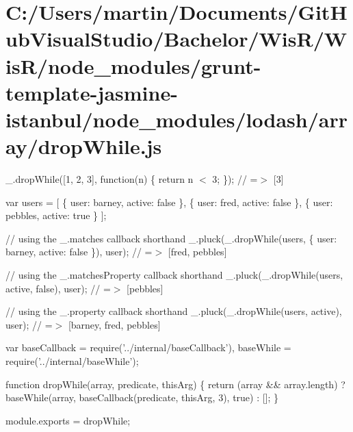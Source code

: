 \hypertarget{_c_1_2_users_2martin_2_documents_2_git_hub_visual_studio_2_bachelor_2_wis_r_2_wis_r_2node_module6c7fd154a53e7b2267a868252c2c0d6c}{}\section{C\+:/\+Users/martin/\+Documents/\+Git\+Hub\+Visual\+Studio/\+Bachelor/\+Wis\+R/\+Wis\+R/node\+\_\+modules/grunt-\/template-\/jasmine-\/istanbul/node\+\_\+modules/lodash/array/drop\+While.\+js}
\+\_\+.\+drop\+While(\mbox{[}1, 2, 3\mbox{]}, function(n) \{ return n $<$ 3; \}); // =$>$ \mbox{[}3\mbox{]}

var users = \mbox{[} \{ \textquotesingle{}user\textquotesingle{}\+: \textquotesingle{}barney\textquotesingle{}, \textquotesingle{}active\textquotesingle{}\+: false \}, \{ \textquotesingle{}user\textquotesingle{}\+: \textquotesingle{}fred\textquotesingle{}, \textquotesingle{}active\textquotesingle{}\+: false \}, \{ \textquotesingle{}user\textquotesingle{}\+: \textquotesingle{}pebbles\textquotesingle{}, \textquotesingle{}active\textquotesingle{}\+: true \} \mbox{]};

// using the {\ttfamily \+\_\+.\+matches} callback shorthand \+\_\+.\+pluck(\+\_\+.\+drop\+While(users, \{ \textquotesingle{}user\textquotesingle{}\+: \textquotesingle{}barney\textquotesingle{}, \textquotesingle{}active\textquotesingle{}\+: false \}), \textquotesingle{}user\textquotesingle{}); // =$>$ \mbox{[}\textquotesingle{}fred\textquotesingle{}, \textquotesingle{}pebbles\textquotesingle{}\mbox{]}

// using the {\ttfamily \+\_\+.\+matches\+Property} callback shorthand \+\_\+.\+pluck(\+\_\+.\+drop\+While(users, \textquotesingle{}active\textquotesingle{}, false), \textquotesingle{}user\textquotesingle{}); // =$>$ \mbox{[}\textquotesingle{}pebbles\textquotesingle{}\mbox{]}

// using the {\ttfamily \+\_\+.\+property} callback shorthand \+\_\+.\+pluck(\+\_\+.\+drop\+While(users, \textquotesingle{}active\textquotesingle{}), \textquotesingle{}user\textquotesingle{}); // =$>$ \mbox{[}\textquotesingle{}barney\textquotesingle{}, \textquotesingle{}fred\textquotesingle{}, \textquotesingle{}pebbles\textquotesingle{}\mbox{]}


\begin{DoxyCodeInclude}
var baseCallback = require(\textcolor{stringliteral}{'../internal/baseCallback'}),
    baseWhile = require(\textcolor{stringliteral}{'../internal/baseWhile'});

\textcolor{keyword}{function} dropWhile(array, predicate, thisArg) \{
  \textcolor{keywordflow}{return} (array && array.length)
    ? baseWhile(array, baseCallback(predicate, thisArg, 3), \textcolor{keyword}{true})
    : [];
\}

module.exports = dropWhile;
\end{DoxyCodeInclude}
 